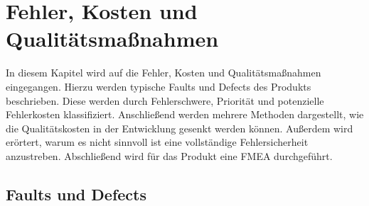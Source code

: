 \section{Fehler, Kosten und Qualitätsmaßnahmen}

In diesem Kapitel wird auf die Fehler, Kosten und Qualitätsmaßnahmen eingegangen.
Hierzu werden typische Faults und Defects des Produkts beschrieben.
Diese werden durch Fehlerschwere, Priorität und potenzielle Fehlerkosten klassifiziert. 
Anschließend werden mehrere Methoden dargestellt, wie die Qualitätskosten in der Entwicklung gesenkt werden können.
Außerdem wird erörtert, warum es nicht sinnvoll ist eine vollständige Fehlersicherheit anzustreben.
Abschließend wird für das Produkt eine \ac{FMEA} durchgeführt.

\subsection{Faults und Defects}

